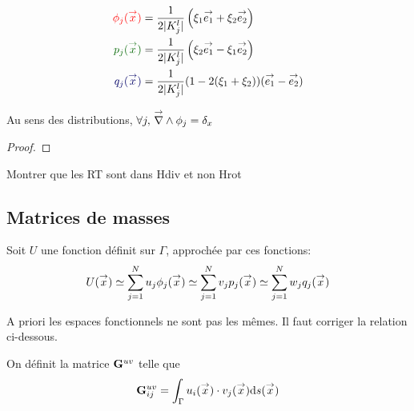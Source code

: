     \begin{minipage}{0.53\textwidth}
      \centering
      \begin{tikzpicture}[scale=2.5]
        
      \end{tikzpicture}
    \end{minipage}
    \begin{minipage}{0.45\textwidth}
      \begin{align*}
        \color{red}{\phi_j(\vx)} &= \frac{1}{2|K_j^l|}\left(\xi_1 \vect{e_1} + \xi_2 \vect{e_2}\right)\\
        \color{black!60!green}{p_j(\vx)} &= \frac{1}{2|K_j^l|}\left(\xi_2 \vect{e_1} -\xi_1 \vect{e_2}\right)\\
        \color{black!60!blue}{q_j(\vx)} &= \frac{1}{2|K_j^l|}(1-2(\xi_1+\xi_2))(\vect{e_1} -\vect{e_2})
      \end{align*}
    \end{minipage}

    \begin{prop}
      Au sens des distributions, \(\forall j,\, \vrot \phi_j = \delta_x\)
    \end{prop}
    \begin{proof}
    \end{proof}

    \begin{TODO}
      Montrer que les RT sont dans Hdiv et non Hrot
    \end{TODO}

  \subsection{Matrices de masses}
    Soit \(U\) une fonction définit sur \(\Gamma\), approchée par ces fonctions: 
    \[ U(\vx) \simeq \sum\limits_{j=1}^N u_j \phi_j(\vx) \simeq \sum\limits_{j=1}^N v_j p_j(\vx) \simeq \sum\limits_{j=1}^N w_j q_j(\vx)
    \]

    \begin{TODO}
      A priori les espaces fonctionnels ne sont pas les mêmes. Il faut corriger la relation ci-dessous.
    \end{TODO}

    \begin{defn}
      On définit la matrice \(\mG{u}{v}\) telle que
      \begin{equation}
        \mG{u}{v}_{ij} = \int_\Gamma u_i(\vx)\cdot v_j(\vx) \dd{s}(\vx)
      \end{equation}
    \end{defn}


